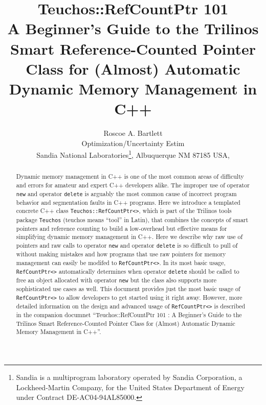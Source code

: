 \documentclass[pdf,ps2pdf,11pt]{SANDreport}
\title{\center
{\Huge\bf Teuchos::RefCountPtr 101}\\[1.5ex]
A Beginner's Guide to the Trilinos Smart Reference-Counted Pointer
Class for (Almost) Automatic Dynamic Memory Management in C++
}
\author{
Roscoe A. Bartlett \\ Optimization/Uncertainty Estim \\
Sandia National Laboratories\footnote{
Sandia is a multiprogram laboratory operated by Sandia Corporation, a
Lockheed-Martin Company, for the United States Department of Energy
under Contract DE-AC04-94AL85000.}, Albuquerque NM 87185 USA, \\
}
\date{}
\begin{document}
\maketitle

%

%
\begin{abstract}
%
Dynamic memory management in C++ is one of the most common areas of
difficulty and errors for amateur and expert C++ developers alike.
The improper use of operator {}\texttt{new} and operator
{}\texttt{delete} is arguably the most common cause of incorrect
program behavior and segmentation faults in C++ programs.  Here we
introduce a templated concrete C++ class
{}\texttt{Teuchos\-::Ref\-Count\-Ptr<>}, which is part of the Trilinos
tools package {}\texttt{Teuchos} (teuchos means ``tool'' in Latin),
that combines the concepts of smart pointers and reference counting to
build a low-overhead but effective means for simplifying dynamic
memory management in C++.  Here we describe why raw use of pointers
and raw calls to operator {}\texttt{new} and operator
{}\texttt{delete} is so difficult to pull of without making mistakes
and how programs that use raw pointers for memory management can
easily be modifed to {}\texttt{Ref\-Count\-Ptr<>}.  In its most basic
usage, {}\texttt{Ref\-Count\-Ptr<>} automatically determines when
operator {}\texttt{delete} should be called to free an object
allocated with operator {}\texttt{new} but the class also supports
more sophisticated use cases as well.  This document provides just the
most basic usage of {}\texttt{Ref\-Count\-Ptr<>} to allow developers
to get started using it right away.  However, more detailed
information on the design and advanced usage of
{}\texttt{Ref\-Count\-Ptr<>} is described in the companion documnet
``Teuchos::RefCountPtr 101 : A Beginner's Guide to the Trilinos Smart
Reference-Counted Pointer Class for (Almost) Automatic Dynamic Memory
Management in C++''.
%
\end{abstract}
%

%
\clearpage
\end{document}
